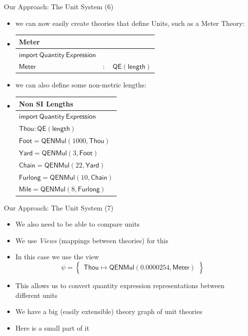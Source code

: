 \documentclass{beamer}
\begin{document}
  \begin{frame}{Our Approach: The Unit System (6)}
    \begin{itemize}[<+->]
      \item we can now easily create theories that define Units, such as a Meter Theory:
      \item
          \begin{tabular}{|l l l|}
            \hline
            \textsf{Meter} &&\\\hline
            $ \mathsf{import \ Quantity\ Expression}$ &&\\
            \hline
            $\mathsf{Meter}$ & $:$ & $ \mathsf{QE} \left( \mathsf{length} \right)$\\\hline
          \end{tabular}
    \item we can also define some non-metric lengths:
    \item
      \begin{tabular}{|l|}
        \hline
        \textsf{Non SI Lengths}\\\hline
        $ \mathsf{import \ Quantity\ Expression}$\\
        \hline
        $\mathsf{Thou} : \mathsf{QE}\left( \mathsf{length} \right)$\\
        $\mathsf{Foot} = \mathsf{QENMul} \left( 1000, \mathsf{Thou} \right)$\\
        $\mathsf{Yard} = \mathsf{QENMul} \left( 3, \mathsf{Foot} \right)$\\
        $\mathsf{Chain} = \mathsf{QENMul} \left( 22, \mathsf{Yard} \right)$\\
        $\mathsf{Furlong} = \mathsf{QENMul} \left( 10, \mathsf{Chain} \right)$\\
        $\mathsf{Mile} = \mathsf{QENMul} \left( 8, \mathsf{Furlong} \right)$\\
        \hline
      \end{tabular}
    \end{itemize}
  \end{frame}

  \begin{frame}{Our Approach: The Unit System (7)}
    \begin{itemize}[<+->]
      \item We also need to be able to compare units
      \item We use \textit{Views} (mappings between theories) for this
      \item In this case we use the view
        \[
          \psi = \left\{\begin{array}{l}
            \mathsf{Thou} \mapsto \mathsf{QENMul} \left( 0.0000254, \mathsf{Meter} \right)
          \end{array}\right\}
        \]
      \item This allows us to convert quantity expression representations between different units
      \item We have a big (easily extensible) theory graph of unit theories
      \item Here is a small part of it
    \end{itemize}
  \end{frame}
\end{document}
